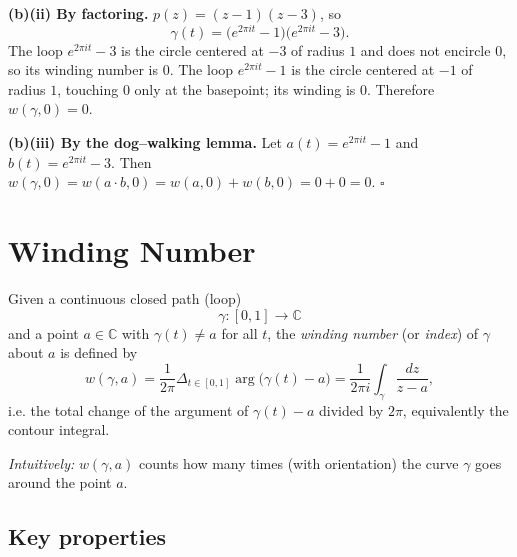 \documentclass[12pt,a4paper]{article}
\newcommand{\qed}{\hfill$\square$}
\theoremstyle{plain}
\theoremstyle{definition}
\theoremstyle{remark}
\theoremstyle{remark}
\begin{document}
\smallskip

\noindent\textbf{(b)(ii) By factoring.}
$p(z)=(z-1)(z-3)$, so
\[
\gamma(t)=\big(e^{2\pi i t}-1\big)\big(e^{2\pi i t}-3\big).
\]
The loop $e^{2\pi i t}-3$ is the circle centered at $-3$ of radius $1$ and does not encircle $0$,
so its winding number is $0$. The loop $e^{2\pi i t}-1$ is the circle centered at $-1$ of radius $1$,
touching $0$ only at the basepoint; its winding is $0$. Therefore $w(\gamma,0)=0$.

\smallskip

\noindent\textbf{(b)(iii) By the dog–walking lemma.}
Let $a(t)=e^{2\pi i t}-1$ and $b(t)=e^{2\pi i t}-3$. Then
$w(\gamma,0)=w(a\cdot b,0)=w(a,0)+w(b,0)=0+0=0$.
\qed

\section*{Winding Number}

Given a continuous closed path (loop) 
\[
\gamma : [0,1] \to \mathbb{C}
\]
and a point \(a \in \mathbb{C}\) with \(\gamma(t) \neq a\) for all \(t\),
the \emph{winding number} (or \emph{index}) of \(\gamma\) about \(a\) is defined by
\[
w(\gamma,a)
= \frac{1}{2\pi} \Delta_{t\in[0,1]} \arg\bigl(\gamma(t)-a\bigr)
= \frac{1}{2\pi i}\int_\gamma \frac{dz}{z-a},
\]
i.e. the total change of the argument of \(\gamma(t)-a\) divided by \(2\pi\),
equivalently the contour integral.

\smallskip

\noindent
\textit{Intuitively:} \(w(\gamma,a)\) counts how many times (with orientation) the curve \(\gamma\)
goes around the point \(a\).

\bigskip
\subsection*{Key properties}
\end{document}
